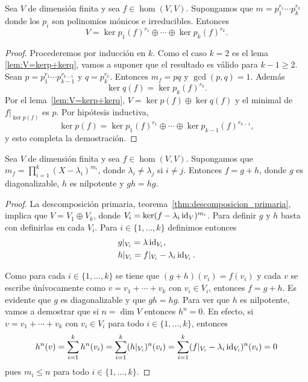 \begin{thm}
    \label{thm:descomposicion_primaria}
	Sea $V$ de dimensión finita y sea $f\in\hom(V,V)$. Supongamos que
	$m=p_1^{r_1}\cdots p_k^{r_k}$ donde los $p_i$ son polinomios mónicos e
	irreducibles. Entonces
	\[
		V=\ker p_1(f)^{r_1}\oplus\cdots\oplus\ker p_k(f)^{r_k}.
	\]

	\begin{proof}
		Procederemos por inducción en $k$. Como el caso $k=2$ es el lema
		\ref{lem:V=kerp+kerq}, vamos a suponer que el resultado es válido para
		$k-1\geq2$. Sean $p=p_1^{r_1}\cdots p_{k-1}^{r_{k-1}}$ y $q=p_k^{r_k}$. Entonces 
		$m_f=pq$ y $\gcd(p,q)=1$. Además 
		\[
			\ker q(f)=\ker p_k(f)^{r_k}.
		\]
		Por el lema~\ref{lem:V=kerp+kerq}, $V=\ker p(f)\oplus\ker q(f)$ y el
		minimal de $f|_{\ker p(f)}$ es $p$.  Por hipótesis inductiva, 
		\[
			\ker p(f)=\ker p_1(f)^{r_1}\oplus\cdots\oplus\ker p_{k-1}(f)^{r_{k-1}},
		\]
		y esto completa la demostración.
	\end{proof}
\end{thm}

\begin{cor}
    \label{cor:JordanChevalley}
	\label{Jordan--Chevalley!descomposición de}
	Sea $V$ de dimensión finita y sea $f\in\hom(V,V)$. Supongamos que
	$m_f=\prod_{i=1}^k(X-\lambda_i)^{m_i}$, donde $\lambda_i\ne\lambda_j$ si
	$i\ne j$. Entonces $f=g+h$, donde $g$ es diagonalizable, $h$ es nilpotente
	y $gh=hg$. 

    \begin{proof}
        La descomposición primaria, teorema~\ref{thm:descomposicion_primaria},
		implica que $V=V_1\oplus V_k$, donde $V_i=\ker(f-\lambda_i\operatorname{id}_V)^{m_i}$. 
        Para definir $g$ y $h$
        basta con definirlas en cada $V_i$. Para 
        $i\in\{1,\dots,k\}$ definimos entonces 
        \begin{align*}
            &g|_{V_i}=\lambda\operatorname{id}_{V_i},\\
            &h|_{V_i}=f|_{V_i}-\lambda_i\operatorname{id}_{V_i}.
        \end{align*}

		Como para cada $i\in\{1,\dots,k\}$ se tiene que $(g+h)(v_i)=f(v_i)$ y
		cada $v$ se escribe únívocamente como $v=v_1+\cdots+v_k$ con $v_i\in
		V_i$, entonces $f=g+h$. Es evidente que $g$ es diagonalizable y que
		$gh=hg$. Para ver que $h$ es nilpotente, vamos a demostrar que si
		$n=\dim V$ entonces $h^n=0$. En efecto, si $v=v_1+\cdots+v_k$ con
		$v_i\in V_i$ para todo $i\in\{1,\dots,k\}$, entonces 
		\[
		h^n(v)=\sum_{i=1}^kh^n(v_i)=\sum_{i=1}^k(h|_{V_i})^n(v_i)=\sum_{i=1}^k(f|_{V_i}-\lambda_i\operatorname{id}_{V_i})^n(v_i)=0
		\]
		pues $m_i\leq n$ para todo $i\in\{1,\dots,k\}$. 
    \end{proof}
\end{cor}

